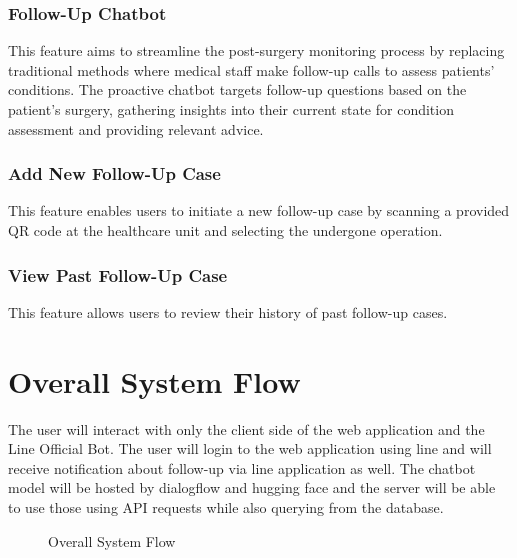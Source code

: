 \documentclass[12pt,oneside,openright,a4paper]{cpe-english-project}
\begin{document}
      \subsubsection{Follow-Up Chatbot}
      \qquad This feature aims to streamline the post-surgery monitoring process by replacing traditional methods where medical staff make follow-up calls to assess patients' conditions. The proactive chatbot targets follow-up questions based on the patient’s surgery, gathering insights into their current state for condition assessment and providing relevant advice. \par
      \subsubsection{Add New Follow-Up Case}
      \qquad This feature enables users to initiate a new follow-up case by scanning a provided QR code at the healthcare unit and selecting the undergone operation. \par
      \subsubsection{View Past Follow-Up Case}
      \qquad This feature allows users to review their history of past follow-up cases. 

  \section{Overall System Flow}
    \qquad The user will interact with only the client side of the web application and the Line Official Bot. The user will login to the web application using line and will receive notification about follow-up via line application as well. The chatbot model will be hosted by dialogflow and hugging face and the server will be able to use those using API requests while also querying from the database. \par
    \begin{figure}[!h]
      \centering
      \caption{Overall System Flow}\label{fig:Overall_System_Flow}
    \end{figure}
\end{document}
